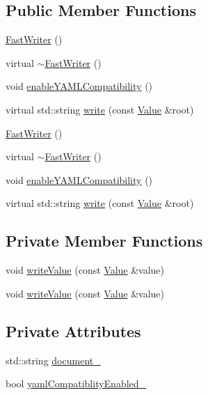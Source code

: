 \subsection*{Public Member Functions}
\begin{DoxyCompactItemize}
\item 
\hyperlink{classJson_1_1FastWriter_a1bbc73ce1a1cc7b09cd1e02db3905170}{Fast\-Writer} ()
\item 
virtual \hyperlink{classJson_1_1FastWriter_a7eb61405d041a915e5e980be97a707aa}{$\sim$\-Fast\-Writer} ()
\item 
void \hyperlink{classJson_1_1FastWriter_a78d98e9f76d33660ad6e6a1abe287d45}{enable\-Y\-A\-M\-L\-Compatibility} ()
\item 
virtual std\-::string \hyperlink{classJson_1_1FastWriter_a0f64b9e1fce6b743aad3f100cfc33427}{write} (const \hyperlink{classJson_1_1Value}{Value} \&root)
\item 
\hyperlink{classJson_1_1FastWriter_a1bbc73ce1a1cc7b09cd1e02db3905170}{Fast\-Writer} ()
\item 
virtual \hyperlink{classJson_1_1FastWriter_a7eb61405d041a915e5e980be97a707aa}{$\sim$\-Fast\-Writer} ()
\item 
void \hyperlink{classJson_1_1FastWriter_a78d98e9f76d33660ad6e6a1abe287d45}{enable\-Y\-A\-M\-L\-Compatibility} ()
\item 
virtual std\-::string \hyperlink{classJson_1_1FastWriter_a0f64b9e1fce6b743aad3f100cfc33427}{write} (const \hyperlink{classJson_1_1Value}{Value} \&root)
\end{DoxyCompactItemize}
\subsection*{Private Member Functions}
\begin{DoxyCompactItemize}
\item 
void \hyperlink{classJson_1_1FastWriter_a2ef4a2ce13a341171f01f414f4fdd765}{write\-Value} (const \hyperlink{classJson_1_1Value}{Value} \&value)
\item 
void \hyperlink{classJson_1_1FastWriter_a2ef4a2ce13a341171f01f414f4fdd765}{write\-Value} (const \hyperlink{classJson_1_1Value}{Value} \&value)
\end{DoxyCompactItemize}
\subsection*{Private Attributes}
\begin{DoxyCompactItemize}
\item 
std\-::string \hyperlink{classJson_1_1FastWriter_afc70d465b79bfc7741ff75294dcefeab}{document\-\_\-}
\item 
bool \hyperlink{classJson_1_1FastWriter_a4c4c1911179bf472d24492915b0e489a}{yaml\-Compatiblity\-Enabled\-\_\-}
\end{DoxyCompactItemize}


